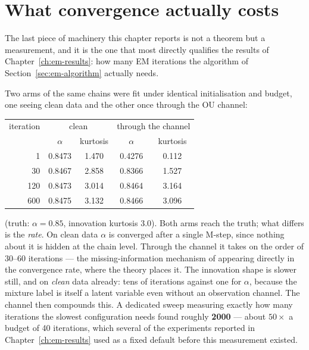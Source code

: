 \section{What convergence actually costs}\label{sec:em-convergence}

The last piece of machinery this chapter reports is not a theorem but a
measurement, and it is the one that most directly qualifies the results of
Chapter~\ref{ch:em-results}: how many EM iterations the algorithm of
Section~\ref{sec:em-algorithm} actually needs.

Two arms of the same chains were fit under identical initialisation and
budget, one seeing clean data and the other once through the OU channel:

\begin{center}
\begin{tabular}{@{}rcccc@{}}
\toprule
iteration & \multicolumn{2}{c}{clean} & \multicolumn{2}{c}{through the channel} \\
 & $\alpha$ & kurtosis & $\alpha$ & kurtosis \\
\midrule
1   & 0.8473 & 1.470 & 0.4276 & 0.112 \\
30  & 0.8467 & 2.858 & 0.8366 & 1.527 \\
120 & 0.8473 & 3.014 & 0.8464 & 3.164 \\
600 & 0.8475 & 3.132 & 0.8466 & 3.096 \\
\bottomrule
\end{tabular}
\end{center}
\noindent(truth: $\alpha=0.85$, innovation kurtosis $3.0$). Both arms reach
the truth; what differs is the \emph{rate}. On clean data $\alpha$ is
converged after a single M-step, since nothing about it is hidden at the
chain level. Through the channel it takes on the order of $30$--$60$
iterations --- the missing-information mechanism of
\citet{dempster1977maximum} appearing directly in the convergence rate, where
the theory places it. The innovation shape is slower still, and on \emph{clean}
data already: tens of iterations against one for $\alpha$, because the
mixture label is itself a latent variable even without an observation
channel. The channel then compounds this. A dedicated sweep measuring exactly
how many iterations the slowest configuration needs found roughly
\textbf{2000} --- about $50\times$ a budget of 40 iterations, which several of
the experiments reported in Chapter~\ref{ch:em-results} used as a fixed
default before this measurement existed.

